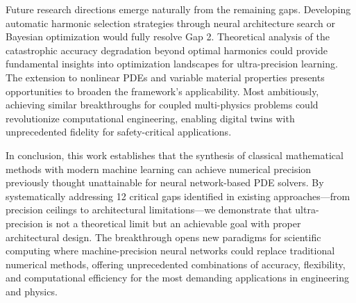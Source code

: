 Future research directions emerge naturally from the remaining gaps. Developing automatic harmonic selection strategies through neural architecture search or Bayesian optimization would fully resolve Gap 2. Theoretical analysis of the catastrophic accuracy degradation beyond optimal harmonics could provide fundamental insights into optimization landscapes for ultra-precision learning. The extension to nonlinear PDEs and variable material properties presents opportunities to broaden the framework's applicability. Most ambitiously, achieving similar breakthroughs for coupled multi-physics problems could revolutionize computational engineering, enabling digital twins with unprecedented fidelity for safety-critical applications.

In conclusion, this work establishes that the synthesis of classical mathematical methods with modern machine learning can achieve numerical precision previously thought unattainable for neural network-based PDE solvers. By systematically addressing 12 critical gaps identified in existing approaches—from precision ceilings to architectural limitations—we demonstrate that ultra-precision is not a theoretical limit but an achievable goal with proper architectural design. The breakthrough opens new paradigms for scientific computing where machine-precision neural networks could replace traditional numerical methods, offering unprecedented combinations of accuracy, flexibility, and computational efficiency for the most demanding applications in engineering and physics.




